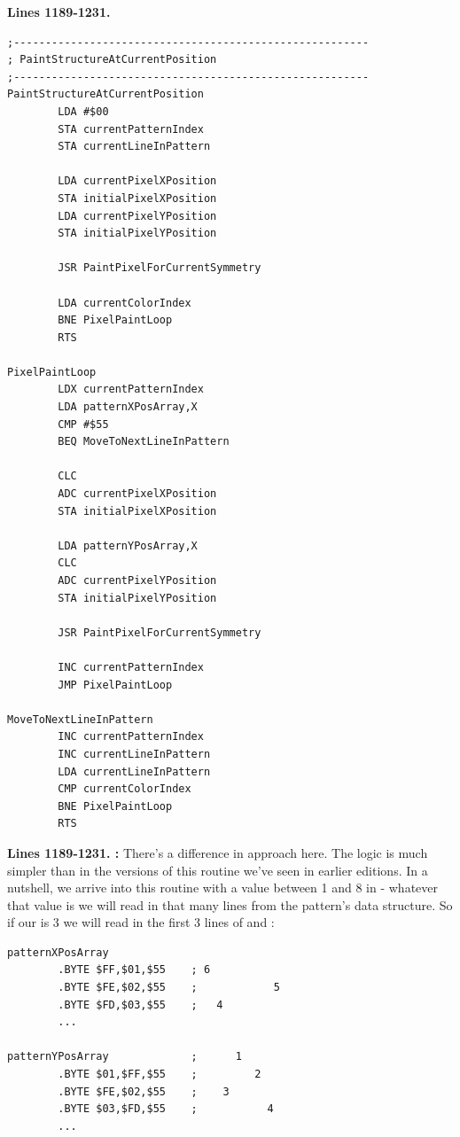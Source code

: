 \clearpage
\textbf{Lines 1189-1231. } 
\begin{lstlisting}[caption = All the pattern data structures in Psychedelia organized into a set of arrays.]
;--------------------------------------------------------
; PaintStructureAtCurrentPosition
;--------------------------------------------------------
PaintStructureAtCurrentPosition   
        LDA #$00
        STA currentPatternIndex
        STA currentLineInPattern

        LDA currentPixelXPosition
        STA initialPixelXPosition
        LDA currentPixelYPosition
        STA initialPixelYPosition

        JSR PaintPixelForCurrentSymmetry

        LDA currentColorIndex
        BNE PixelPaintLoop
        RTS 

PixelPaintLoop   
        LDX currentPatternIndex
        LDA patternXPosArray,X
        CMP #$55
        BEQ MoveToNextLineInPattern

        CLC 
        ADC currentPixelXPosition
        STA initialPixelXPosition

        LDA patternYPosArray,X
        CLC 
        ADC currentPixelYPosition
        STA initialPixelYPosition

        JSR PaintPixelForCurrentSymmetry

        INC currentPatternIndex
        JMP PixelPaintLoop

MoveToNextLineInPattern   
        INC currentPatternIndex
        INC currentLineInPattern
        LDA currentLineInPattern
        CMP currentColorIndex
        BNE PixelPaintLoop
        RTS 
\end{lstlisting}
\clearpage

\textbf{Lines 1189-1231. :} There's a difference in approach here.
The logic is much simpler than in the versions of this routine we've seen in earlier editions. In a nutshell, we
arrive into this routine with a value between 1 and 8 in  - whatever that value is we will
read in that many lines from the pattern's data structure.  So if our  is 3 we will
read in the first 3 lines of  and :

\begin{lstlisting}
patternXPosArray             
        .BYTE $FF,$01,$55    ; 6              
        .BYTE $FE,$02,$55    ;            5   
        .BYTE $FD,$03,$55    ;   4            
        ...

patternYPosArray             ;      1         
        .BYTE $01,$FF,$55    ;         2      
        .BYTE $FE,$02,$55    ;    3           
        .BYTE $03,$FD,$55    ;           4    
        ...
\end{lstlisting}

